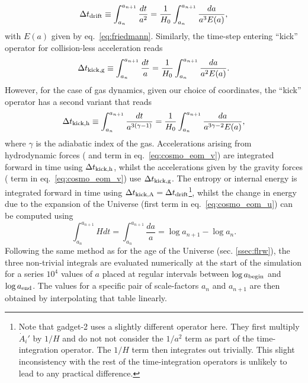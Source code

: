 \begin{equation}
  \Delta t_{\rm drift} \equiv \int_{a_n}^{a_{n+1}} \frac{dt}{a^2} = \frac{1}{H_0} \int_{a_n}^{a_{n+1}} \frac{da}{a^3E(a)},
\end{equation}
with $E(a)$ given by eq.~\ref{eq:friedmann}. Similarly, the time-step
entering ``kick'' operator for collision-less acceleration reads
\begin{equation}
  \Delta t_{\rm kick,g} \equiv \int_{a_n}^{a_{n+1}} \frac{dt}{a} = \frac{1}{H_0} \int_{a_n}^{a_{n+1}} \frac{da}{a^2E(a)}.
\end{equation}
However, for the case of gas dynamics, given our choice of
coordinates, the ``kick'' operator has a second variant that reads
\begin{equation}
  \Delta t_{\rm kick,h} \equiv \int_{a_n}^{a_{n+1}} \frac{dt}{a^{3(\gamma-1)}} = \frac{1}{H_0} \int_{a_n}^{a_{n+1}} \frac{da}{a^{3\gamma - 2}E(a)},
\end{equation}
where $\gamma$ is the adiabatic index of the gas.  Accelerations
arising from hydrodynamic forces ( and  term in
eq.~\ref{eq:cosmo_eom_v}) are integrated forward in time using $\Delta
t_{\rm kick,h}$, whilst the accelerations given by the gravity forces
( term in eq.~\ref{eq:cosmo_eom_v}) use $\Delta t_{\rm
  kick,g}$. The entropy or internal energy is integrated forward in
time using $\Delta t_{\rm kick,A} = \Delta t_{\rm
  drift}$\footnote{Note that {\sc gadget-2} uses a slightly different
  operator here. They first multiply $\dot{A}_i'$ by $1/H$ and do not
  not consider the $1/a^2$ term as part of the time-integration
  operator. The $1/H$ term then integrates out trivially. This slight
  inconsistency with the rest of the time-integration operators is
  unlikely to lead to any practical difference.}, whilst the change in
energy due to the expansion of the Universe (first term in
eq.~\ref{eq:cosmo_eom_u}) can be computed using
\begin{equation}
  \int_{a_n}^{a_{n+1}} H dt = \int_{a_n}^{a_{n+1}} \frac{da}{a} =
  \log{a_{n+1}} - \log{a_n}.
\end{equation}
Following the same method as for the age of the Universe
(sec. \ref{ssec:flrw}), the three non-trivial integrals are evaluated
numerically at the start of the simulation for a series $10^4$ values
of $a$ placed at regular intervals between $\log a_{\rm begin}$ and
$\log a_{\rm end}$. The values for a specific pair of scale-factors
$a_n$ and $a_{n+1}$ are then obtained by interpolating that table
linearly.


